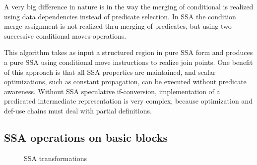 A very big difference in nature is in the way the merging of conditional is realized using data dependencies instead of predicate selection. In SSA the condition merge assignment is not realized thru merging of predicates, but using two successive conditional moves operations.

This algorithm takes as input a structured region in pure SSA form and produces a pure SSA using conditional move instructions to realize join points. One benefit of this approach is that all SSA properties are maintained, and scalar optimizations, such as constant propagation, can be executed without predicate awareness. Without SSA speculative if-conversion, implementation of a predicated intermediate representation is very complex, because optimization and def-use chains must deal with partial definitions.

\subsection{SSA operations on basic blocks}

\begin{figure}[h]
\centering

\caption{SSA transformations}
\label{fig: phi_operations}
\end{figure}

